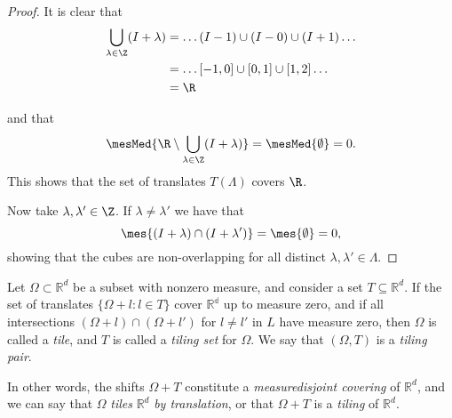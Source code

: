 \begin{proof}
    It is clear that
    \begin{align*}
        \bigcup_{\lambda\in \Z} (I + \lambda) &= \dots (I-1) \cup (I-0) \cup (I+1) \dots\\ 
        &= \dots [-1,0] \cup [0,1] \cup [1,2] \dots\\
        &= \R
    \end{align*}
    
    and that  %
    \begin{align*}  %
        \mesMed{\R \setminus \bigcup_{\lambda\in \Z} (I + \lambda) } = \mesMed{\emptyset} = 0.
    \end{align*}
    This shows that the set of translates $T(\Lambda)$ covers $\R$. %
    
    Now take $\lambda,\lambda' \in \Z$. %
    If $\lambda \neq \lambda'$ we have that 
    \begin{equation*}
        \mes{(I+\lambda) \cap (I+\lambda')} = \mes{\emptyset} = 0,
    \end{equation*}
    showing that the cubes are non-overlapping for all distinct $\lambda , \lambda' \in \Lambda$. 
\end{proof}


\begin{definition}
    Let $\Omega \subset \mathbb{R}^d$ be a subset with nonzero measure, and consider a set $T \subseteq \mathbb{R}^d$. If the set of translates ${}$$\{\Omega+l: l\in T\}$ cover $\mathbb{R^d}$ up to measure zero, and if all intersections $(\Omega+l) \cap (\Omega+l')$  for $l\neq l'$ in $L$ have measure zero, then $\Omega$ is called a \emph{tile}, and $T$ is called a \emph{tiling set} for $\Omega$. We say that $(\Omega, T)$ is a \emph{tiling pair}. 
\end{definition}

In other words, the shifts $\Omega + T$ constitute a \emph{measuredisjoint covering} of $\mathbb{R}^d$, and we can say that $\Omega$ \emph{tiles} $\mathbb{R}^d$ \emph{by translation}, or that $\Omega+T$ is a \emph{tiling} of $\mathbb{R}^d$.


